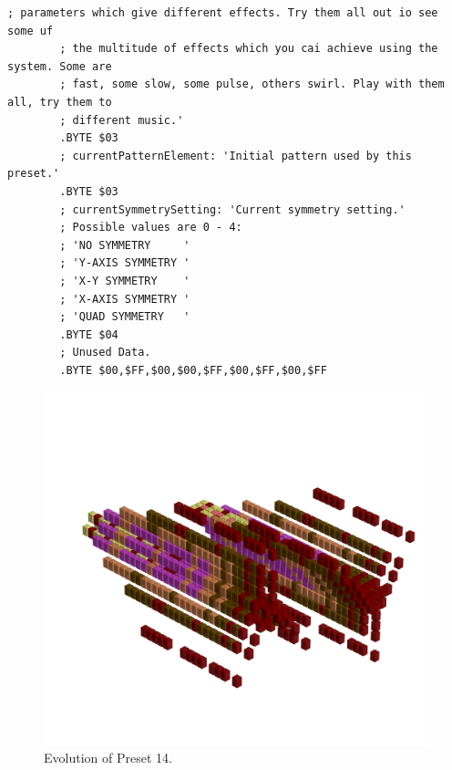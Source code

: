 \begin{lstlisting}[basicstyle=\tiny,caption=Source code for Preset 13.]
        ; parameters which give different effects. Try them all out io see some uf
        ; the multitude of effects which you cai achieve using the system. Some are
        ; fast, some slow, some pulse, others swirl. Play with them all, try them to
        ; different music.'
        .BYTE $03
        ; currentPatternElement: 'Initial pattern used by this preset.'
        .BYTE $03
        ; currentSymmetrySetting: 'Current symmetry setting.'
        ; Possible values are 0 - 4:
        ; 'NO SYMMETRY     '
        ; 'Y-AXIS SYMMETRY '
        ; 'X-Y SYMMETRY    '
        ; 'X-AXIS SYMMETRY '
        ; 'QUAD SYMMETRY   '
        .BYTE $04
        ; Unused Data.
        .BYTE $00,$FF,$00,$00,$FF,$00,$FF,$00,$FF
\end{lstlisting}


\clearpage                                                                 
\begin{figure}[H]                                                          
    \centering                                                             
    \begin{adjustbox}{width=14cm,center}                                   
      \includegraphics[width=14cm]{src/presets/pattern14-45.png}%
    \end{adjustbox}                                                        
\caption{Evolution of Preset 14.}                                           
\end{figure}                                                               
\clearpage                                                                 
                                                                           

